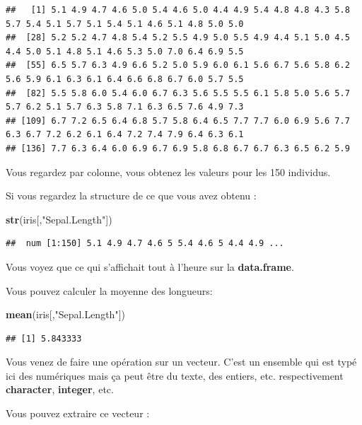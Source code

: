 \documentclass[
]{book}
\newenvironment{Shaded}{\begin{snugshade}}{\end{snugshade}}
\newcommand{\FunctionTok}[1]{\textcolor[rgb]{0.13,0.29,0.53}{\textbf{#1}}}
\newcommand{\NormalTok}[1]{#1}
\newcommand{\StringTok}[1]{\textcolor[rgb]{0.31,0.60,0.02}{#1}}
\begin{document}
\begin{verbatim}
##   [1] 5.1 4.9 4.7 4.6 5.0 5.4 4.6 5.0 4.4 4.9 5.4 4.8 4.8 4.3 5.8 5.7 5.4 5.1 5.7 5.1 5.4 5.1 4.6 5.1 4.8 5.0 5.0
##  [28] 5.2 5.2 4.7 4.8 5.4 5.2 5.5 4.9 5.0 5.5 4.9 4.4 5.1 5.0 4.5 4.4 5.0 5.1 4.8 5.1 4.6 5.3 5.0 7.0 6.4 6.9 5.5
##  [55] 6.5 5.7 6.3 4.9 6.6 5.2 5.0 5.9 6.0 6.1 5.6 6.7 5.6 5.8 6.2 5.6 5.9 6.1 6.3 6.1 6.4 6.6 6.8 6.7 6.0 5.7 5.5
##  [82] 5.5 5.8 6.0 5.4 6.0 6.7 6.3 5.6 5.5 5.5 6.1 5.8 5.0 5.6 5.7 5.7 6.2 5.1 5.7 6.3 5.8 7.1 6.3 6.5 7.6 4.9 7.3
## [109] 6.7 7.2 6.5 6.4 6.8 5.7 5.8 6.4 6.5 7.7 7.7 6.0 6.9 5.6 7.7 6.3 6.7 7.2 6.2 6.1 6.4 7.2 7.4 7.9 6.4 6.3 6.1
## [136] 7.7 6.3 6.4 6.0 6.9 6.7 6.9 5.8 6.8 6.7 6.7 6.3 6.5 6.2 5.9
\end{verbatim}

Vous regardez par colonne, vous obtenez les valeurs pour les 150 individus.

Si vous regardez la structure de ce que vous avez obtenu :

\begin{Shaded}
\begin{Highlighting}[]
\FunctionTok{str}\NormalTok{(iris[,}\StringTok{"Sepal.Length"}\NormalTok{])}
\end{Highlighting}
\end{Shaded}

\begin{verbatim}
##  num [1:150] 5.1 4.9 4.7 4.6 5 5.4 4.6 5 4.4 4.9 ...
\end{verbatim}

Vous voyez que ce qui s'affichait tout à l'heure sur la \textbf{data.frame}.

Vous pouvez calculer la moyenne des longueurs:

\begin{Shaded}
\begin{Highlighting}[]
\FunctionTok{mean}\NormalTok{(iris[,}\StringTok{"Sepal.Length"}\NormalTok{])}
\end{Highlighting}
\end{Shaded}

\begin{verbatim}
## [1] 5.843333
\end{verbatim}

Vous venez de faire une opération sur un vecteur. C'est un ensemble qui est typé
ici des numériques mais ça peut être du texte, des entiers, etc. respectivement
\textbf{character}, \textbf{integer}, etc.

Vous pouvez extraire ce vecteur :
\end{document}
